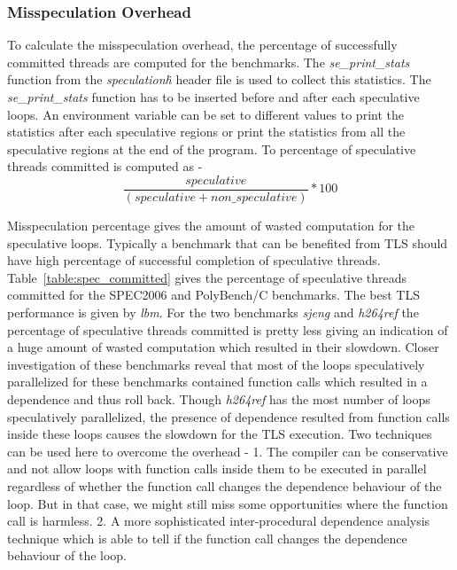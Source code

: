 \documentclass[10pt]{report}          %
\begin{document}
\subsubsection{Misspeculation Overhead}

To calculate the misspeculation overhead, the percentage of successfully committed threads are computed for the benchmarks.  The \textit{se\_print\_stats} function from the \textit{speculation\.h} header file is used to collect this statistics.  The \textit{se\_print\_stats} function has to be inserted before and after each speculative loops.  An environment variable can be set to different values to print the statistics after each speculative regions or print the statistics from all the speculative regions at the end of the program.  To percentage of speculative threads committed is computed as -
\begin{equation}
 \frac{speculative }{\left ( speculative + non\_speculative \right )}\ast 100
\end{equation}

Misspeculation percentage gives the amount of wasted computation for the speculative loops.  Typically a benchmark that can be benefited from TLS should have high percentage of successful completion of speculative threads. Table~\ref{table:spec_committed} gives the percentage of speculative threads committed for the SPEC2006 and PolyBench/C benchmarks.  The best TLS performance is given by \textit{lbm}.  For the two benchmarks \textit{sjeng} and \textit{h264ref} the percentage of speculative threads committed is pretty less giving an indication of a huge amount of wasted computation which resulted in their slowdown.  Closer investigation of these benchmarks reveal that most of the loops speculatively parallelized for these benchmarks contained function calls which resulted in a dependence and thus roll back.  Though \textit{h264ref} has the most number of loops speculatively parallelized, the presence of dependence resulted from function calls inside these loops causes the slowdown for the TLS execution.  Two techniques can be used here to overcome the overhead - 1. The compiler can be conservative and not allow loops with function calls inside them to be executed in parallel regardless of whether the function call changes the dependence behaviour of the loop.  But in that case, we might still miss some opportunities where the function call is harmless.  2. A more sophisticated inter-procedural dependence analysis technique which is able to tell if the function call changes the dependence behaviour of the loop.\\
\end{document}
